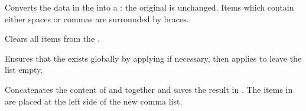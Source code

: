 \documentclass[oneside]{book}
\begin{document}
\begin{function}{\ClistSetFromSeq}
\begin{syntax}
  
\end{syntax}
Converts the data in the  into a :
the original  is unchanged.
Items which contain either spaces or commas are surrounded by braces.
\begin{demohigh}
\SeqPutRight {}
\SeqPutRight {}
\ClistSetFromSeq \lTmpaClist \lTmpaSeq
\ClistVarJoin {}
\end{demohigh}
\end{function}

\begin{function}{\ClistClear}
\begin{syntax}
 
\end{syntax}
Clears all items from the .
\begin{codehigh}
\ClistSet {}
\ClistClear \lTmpaClist
\end{codehigh}
\end{function}

\begin{function}{\ClistClearNew}
\begin{syntax}
 
\end{syntax}
Ensures that the  exists globally by applying
 if necessary, then applies  to leave
the list empty.
\begin{demohigh}
\ClistClearNew \lFooSomeClist
\ClistSet {}
\ClistVarJoin {}
\end{demohigh}
\end{function}

\begin{function}{\ClistConcat}
\begin{syntax}
   
\end{syntax}
Concatenates the content of  and 
together and saves the result in . The items in
 are placed at the left side of the new comma list.
\begin{demohigh}
\ClistSet {}
\ClistSet {}
\ClistConcat \lTmpaClist \lTmpbClist \lTmpcClist
\ClistVarJoin \lTmpaClist { + }
\end{demohigh}
\end{function}
\end{document}
